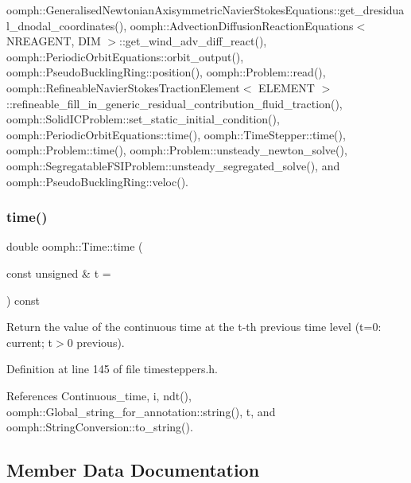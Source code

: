 oomph\+::\+Generalised\+Newtonian\+Axisymmetric\+Navier\+Stokes\+Equations\+::get\+\_\+dresidual\+\_\+dnodal\+\_\+coordinates(), oomph\+::\+Advection\+Diffusion\+Reaction\+Equations$<$ N\+R\+E\+A\+G\+E\+N\+T, D\+I\+M $>$\+::get\+\_\+wind\+\_\+adv\+\_\+diff\+\_\+react(), oomph\+::\+Periodic\+Orbit\+Equations\+::orbit\+\_\+output(), oomph\+::\+Pseudo\+Buckling\+Ring\+::position(), oomph\+::\+Problem\+::read(), oomph\+::\+Refineable\+Navier\+Stokes\+Traction\+Element$<$ E\+L\+E\+M\+E\+N\+T $>$\+::refineable\+\_\+fill\+\_\+in\+\_\+generic\+\_\+residual\+\_\+contribution\+\_\+fluid\+\_\+traction(), oomph\+::\+Solid\+I\+C\+Problem\+::set\+\_\+static\+\_\+initial\+\_\+condition(), oomph\+::\+Periodic\+Orbit\+Equations\+::time(), oomph\+::\+Time\+Stepper\+::time(), oomph\+::\+Problem\+::time(), oomph\+::\+Problem\+::unsteady\+\_\+newton\+\_\+solve(), oomph\+::\+Segregatable\+F\+S\+I\+Problem\+::unsteady\+\_\+segregated\+\_\+solve(), and oomph\+::\+Pseudo\+Buckling\+Ring\+::veloc().

\mbox{\label{classoomph_1_1Time_a4af91dd6c41ca7defd431bf53c518ba5}} 
\subsubsection{\texorpdfstring{time()}{time()}\hspace{0.1cm}{\footnotesize\ttfamily [2/2]}}
{\footnotesize\ttfamily double oomph\+::\+Time\+::time (\begin{DoxyParamCaption}\item[{const unsigned \&}]{t = {} }\end{DoxyParamCaption}) const\hspace{0.3cm}{\ttfamily [inline]}}



Return the value of the continuous time at the t-\/th previous time level (t=0\+: current; t$>$0 previous). 



Definition at line 145 of file timesteppers.\+h.



References Continuous\+\_\+time, i, ndt(), oomph\+::\+Global\+\_\+string\+\_\+for\+\_\+annotation\+::string(), t, and oomph\+::\+String\+Conversion\+::to\+\_\+string().



\subsection{Member Data Documentation}
\mbox{\label{classoomph_1_1Time_a0d304d449babd0531b76668c6548ad4b}} 
